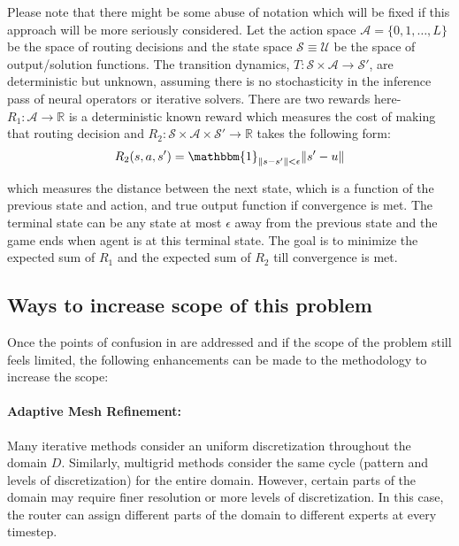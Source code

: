 \documentclass[12pt]{article}
\begin{document}
Please note that there might be some abuse of notation which will be fixed if this approach will be more seriously considered. Let the action space $\mathcal{A} = \{0, 1, \ldots, L\}$ be the space of routing decisions and the state space $\mathcal{S} \equiv \mathcal{U}$ be the space of output/solution functions. The transition dynamics, $T: \mathcal{S} \times \mathcal{A} \to \mathcal{S}'$, are deterministic but unknown, assuming there is no stochasticity in the inference pass of neural operators or iterative solvers. There are two rewards here- $R_1: \mathcal{A} \to \mathbb{R}$ is a deterministic known reward which measures the cost of making that routing decision and $R_2: \mathcal{S} \times \mathcal{A} \times \mathcal{S'}\to \mathbb{R}$ takes the following form:
\begin{align*}
    R_2(s, a, s') = \mathbbm{1}_{\|s - s'\| < \epsilon}\|s' - u\|
\end{align*}

which measures the distance between the next state, which is a function of the previous state and action, and true output function if convergence is met. The terminal state can be any state at most $\epsilon$ away from the previous state and the game ends when agent is at this terminal state. The goal is to minimize the expected sum of $R_1$ and the expected sum of $R_2$ till convergence is met.



\subsection{Ways to increase scope of this problem}

Once the points of confusion in  are addressed and if the scope of the problem still feels limited, the following enhancements can be made to the methodology to increase the scope:

\paragraph{Adaptive Mesh Refinement:} Many iterative methods consider an uniform discretization throughout the domain $D$. Similarly, multigrid methods consider the same cycle (pattern and levels of discretization) for the entire domain. However, certain parts of the domain may require finer resolution or more levels of discretization. In this case, the router can assign different parts of the domain to different experts at every timestep. 
\end{document}
